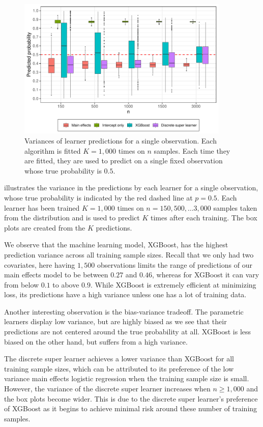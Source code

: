 \documentclass[./main.tex]{subfiles}
\begin{document}
\begin{figure}[H]
    \centering
    \includegraphics[width=0.9\textwidth]{figures/learner_vars_1000.pdf}
    \caption{Variances of learner predictions for a single observation. Each algorithm is fitted $ K = 1,000 $ times on $n$ samples. Each time they are fitted, they are used to predict on a single fixed observation whose true probability is $ 0.5 $.}
    \label{fig:pred_probs_boxplot}
\end{figure}
 illustrates the variance in the predictions by each learner for a single observation, whose true probability is indicated by the red dashed line at $ p = 0.5 $. Each learner has been trained $ K = 1,000 $ times on $ n = 150, 500, \dots 3,000 $ samples taken from the distribution and is used to predict $ K $ times after each training. The box plots are created from the $ K $ predictions. 

We observe that the machine learning model, XGBoost, has the highest prediction variance across all training sample sizes. Recall that we only had two covariates, here having $ 1,500 $ observations limits the range of predictions of our main effects model to be between $ 0.27 $ and $ 0.46 $, whereas for XGBoost it can vary from below $ 0.1 $ to above $ 0.9 $. While XGBoost is extremely efficient at minimizing loss, its predictions have a high variance unless one has a lot of training data.

Another interesting observation is the bias-variance tradeoff. The parametric learners display low variance, but are highly biased as we see that their predictions are not centered around the true probability at all. XGBoost is less biased on the other hand, but suffers from a high variance.

The discrete super learner achieves a lower variance than XGBoost for all training sample sizes, which can be attributed to its preference of the low variance main effects logistic regression when the training sample size is small. However, the variance of the discrete super learner increases when $ n \geq 1,000 $ and the box plots become wider. This is due to the discrete super learner's preference of XGBoost as it begins to achieve minimal risk around these number of training samples. 
\end{document}
